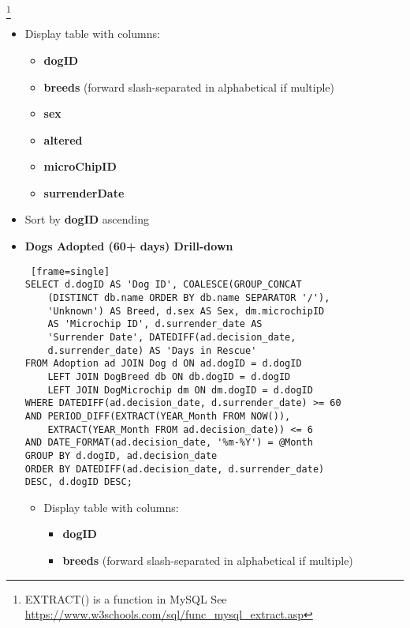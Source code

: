\documentclass{article}
\begin{document}
\begin{itemize}
\begin{itemize}
        \footnote{EXTRACT() is a function in MySQL See \url{https://www.w3schools.com/sql/func_mysql_extract.asp}}
        \begin{itemize}
            \item Display table with columns:
            \begin{itemize}
                \item \textbf{dogID}
                \item \textbf{breeds} (forward slash-separated in alphabetical if multiple)
                \item \textbf{sex}
                \item \textbf{altered}
                \item \textbf{microChipID}
                \item \textbf{surrenderDate}
            \end{itemize}
            \item Sort by \textbf{dogID} ascending
        \end{itemize}
    \end{itemize}
    \begin{itemize}
        \item \textbf{Dogs Adopted (60+ days) Drill-down}
        \begin{Verbatim} [frame=single]
SELECT d.dogID AS 'Dog ID', COALESCE(GROUP_CONCAT
    (DISTINCT db.name ORDER BY db.name SEPARATOR '/'), 
    'Unknown') AS Breed, d.sex AS Sex, dm.microchipID 
    AS 'Microchip ID', d.surrender_date AS 
    'Surrender Date', DATEDIFF(ad.decision_date, 
    d.surrender_date) AS 'Days in Rescue'
FROM Adoption ad JOIN Dog d ON ad.dogID = d.dogID 
    LEFT JOIN DogBreed db ON db.dogID = d.dogID 
    LEFT JOIN DogMicrochip dm ON dm.dogID = d.dogID
WHERE DATEDIFF(ad.decision_date, d.surrender_date) >= 60
AND PERIOD_DIFF(EXTRACT(YEAR_Month FROM NOW()), 
    EXTRACT(YEAR_Month FROM ad.decision_date)) <= 6
AND DATE_FORMAT(ad.decision_date, '%m-%Y') = @Month
GROUP BY d.dogID, ad.decision_date
ORDER BY DATEDIFF(ad.decision_date, d.surrender_date) 
DESC, d.dogID DESC;
        \end{Verbatim}
        \begin{itemize}
            \item Display table with columns:
            \begin{itemize}
                \item \textbf{dogID}
                \item \textbf{breeds} (forward slash-separated in alphabetical if multiple)

\end{itemize}
\end{itemize}
\end{itemize}
\end{itemize}
\end{document}

